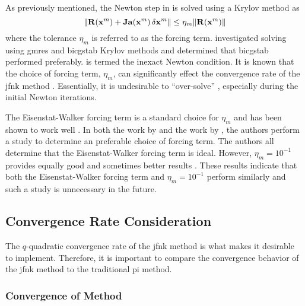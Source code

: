     As previously mentioned, the Newton step in  is solved
    using a Krylov method as
    \begin{equation}
      \label{eq:inexact_newton_condition}
      \| \mathbf{R}(\mathbf{x}^m) + \mathbf{Ja}(\mathbf{x}^m) \, \delta\mathbf{x}^m \| \le 
        \eta_m \| \mathbf{R}(\mathbf{x}^m) \|
    \end{equation}
    where the tolerance $\eta_m$ is referred to as the forcing term.
    \citeauthor{qe2paper} investigated solving
     using \gls{gmres} and \gls{bicgstab}
    Krylov methods and determined that \gls{bicgstab} performed preferably.
     is termed the inexact Newton condition.
    It is known that the choice of forcing term, $\eta_m$, can significantly
    effect the convergence rate of the \gls{jfnk} method \cite{textbookkelley}.
    Essentially, it is undesirable to ``over-solve''
    , especially during the initial Newton
    iterations.

    The Eisenstat-Walker forcing term is a standard choice for $\eta_m$ and has
    been shown to work well \cite{qe2paper,gill_azmy}. In both the work by
    \citeauthor{qe2paper} and the work by \citeauthor{gill_azmy}, the authors
    perform a study to determine an preferable choice of forcing term. The
    authors all determine that the Eisenstat-Walker forcing term is ideal.
    However, $\eta_m = 10^{-1}$ provides equally good and sometimes better
    results \cite{qe2paper,gill_azmy,jfnk_wielandt,ma784notes}. These results 
    indicate that both the Eisenstat-Walker forcing term and $\eta_m = 10^{-1}$
    perform similarly and such a study is unnecessary in the future.

  \subsection{Convergence Rate Consideration}

    The $q$-quadratic convergence rate of the \gls{jfnk} method is what makes it
    desirable to implement. Therefore, it is important to compare the
    convergence behavior of the \gls{jfnk} method to the traditional \gls{pi}
    method.

    \subsubsection{Convergence of  Method}
      \label{sec:dominance_ratio}

